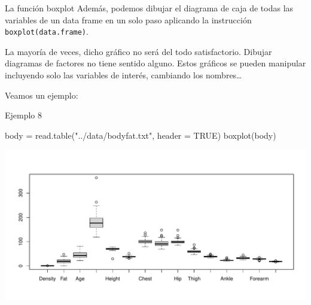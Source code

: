\documentclass[
  ignorenonframetext,
  aspectratio=169]{beamer}
\newenvironment{Shaded}{\begin{snugshade}}{\end{snugshade}}
\newcommand{\AttributeTok}[1]{\textcolor[rgb]{0.77,0.63,0.00}{#1}}
\newcommand{\ConstantTok}[1]{\textcolor[rgb]{0.00,0.00,0.00}{#1}}
\newcommand{\FunctionTok}[1]{\textcolor[rgb]{0.00,0.00,0.00}{#1}}
\newcommand{\NormalTok}[1]{#1}
\newcommand{\OtherTok}[1]{\textcolor[rgb]{0.56,0.35,0.01}{#1}}
\newcommand{\StringTok}[1]{\textcolor[rgb]{0.31,0.60,0.02}{#1}}
\begin{document}
\begin{frame}[fragile]{La función boxplot}
\protect\hypertarget{la-funciuxf3n-boxplot-2}{}
Además, podemos dibujar el diagrama de caja de todas las variables de un
data frame en un solo paso aplicando la instrucción
\texttt{boxplot(data.frame)}.

La mayoría de veces, dicho gráfico no será del todo satisfactorio.
Dibujar diagramas de factores no tiene sentido alguno. Estos gráficos se
pueden manipular incluyendo solo las variables de interés, cambiando los
nombres\ldots{}

Veamos un ejemplo:
\end{frame}

\begin{frame}[fragile]{Ejemplo 8}
\protect\hypertarget{ejemplo-8}{}
\begin{Shaded}
\begin{Highlighting}[]
\NormalTok{body }\OtherTok{=} \FunctionTok{read.table}\NormalTok{(}\StringTok{"../data/bodyfat.txt"}\NormalTok{, }\AttributeTok{header =} \ConstantTok{TRUE}\NormalTok{)}
\FunctionTok{boxplot}\NormalTok{(body)}
\end{Highlighting}
\end{Shaded}

\includegraphics[width=0.8\linewidth]{Hora5_files/figure-beamer/unnamed-chunk-12-1}
\end{frame}
\end{document}
